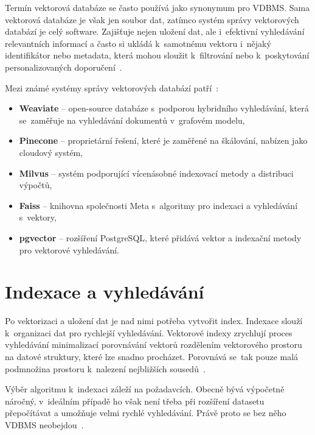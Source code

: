 Termín vektorová databáze se často používá jako synonymum pro VDBMS. Sama vektorová databáze je však jen soubor dat, zatímco systém správy vektorových databází je celý software. Zajišťuje nejen uložení dat, ale i~efektivní vyhledávání relevantních informací a často si ukládá k~samotnému vektoru i~nějaký identifikátor nebo metadata, která mohou sloužit k~filtrování nebo k~poskytování personalizovaných doporučení~\cite{Taipalus_2024}.

Mezi známé systémy správy vektorových databází patří~\cite{pan2024_vector_dbms}:
\begin{itemize}
    \item \textbf{Weaviate} – open-source databáze s~podporou hybridního vyhledávání, která se~zaměřuje na vyhledávání dokumentů v~grafovém modelu,
    \item \textbf{Pinecone} – proprietární řešení, které je zaměřené na škálování, nabízen jako cloudový systém,
    \item \textbf{Milvus} – systém podporující vícenásobné indexovací metody a distribuci výpočtů,
    \item \textbf{Faiss} – knihovna společnosti Meta s~algoritmy pro indexaci a vyhledávání s~vektory,
    \item \textbf{pgvector} – rozšíření PostgreSQL, které přidává vektor a indexační metody pro vektorové vyhledávání.
\end{itemize}


\section{Indexace a vyhledávání}
\label{index}
Po vektorizaci a uložení dat je nad nimi potřeba vytvořit index. Indexace slouží k~organizaci dat pro rychlejší vyhledávání. Vektorové indexy zrychlují proces vyhledávání minimalizací porovnávání vektorů rozdělením vektorového prostoru na datové struktury, které lze snadno procházet. Porovnává se~tak pouze malá podmnožina prostoru k~nalezení nejbližších sousedů~\cite{pan2024_vector_dbms}.

Výběr algoritmu k~indexaci záleží na požadavcích. Obecně bývá výpočetně náročný, v~ideálním případě ho však není třeba při rozšíření datasetu přepočítávat a umožňuje velmi rychlé vyhledávání. Právě proto se bez něho VDBMS neobejdou~\cite{Taipalus_2024}.

